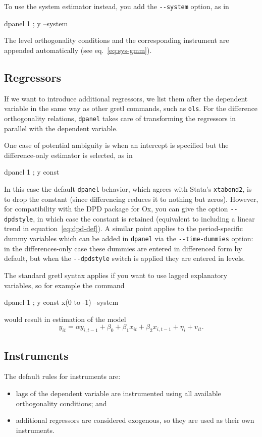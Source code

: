 To use the system estimator instead, you add the \verb|--system|
option, as in
\begin{code}
  dpanel 1 ; y --system
\end{code}
The level orthogonality conditions and the corresponding instrument
are appended automatically (see eq.\ \ref{eq:sys-gmm}).

\subsection{Regressors}

If we want to introduce additional regressors, we list them after the
dependent variable in the same way as other gretl commands, such as
\texttt{ols}.  For the difference orthogonality relations,
\texttt{dpanel} takes care of transforming the regressors in parallel
with the dependent variable.

One case of potential ambiguity is when an intercept is specified but
the difference-only estimator is selected, as in
\begin{code}
  dpanel 1 ; y const
\end{code}
In this case the default \texttt{dpanel} behavior, which agrees with
Stata's \texttt{xtabond2}, is to drop the constant (since differencing
reduces it to nothing but zeros). However, for compatibility with the
DPD package for Ox, you can give the option \verb|--dpdstyle|, in
which case the constant is retained (equivalent to including a linear
trend in equation~\ref{eq:dpd-def}).  A similar point applies to the
period-specific dummy variables which can be added in \texttt{dpanel}
via the \verb|--time-dummies| option: in the differences-only case
these dummies are entered in differenced form by default, but when the
\verb|--dpdstyle| switch is applied they are entered in levels.

The standard gretl syntax applies if you want to use lagged
explanatory variables, so for example the command
\begin{code}
  dpanel 1 ; y const x(0 to -1) --system
\end{code}
would result in estimation of the model
\[
  y_{it} = \alpha y_{i,t-1} + 
  \beta_0 + \beta_1 x_{it} + \beta_2 x_{i,t-1} +
  \eta_{i} + v_{it} .
\]


\subsection{Instruments}

The default rules for instruments are: 
\begin{itemize}
\item lags of the dependent variable are instrumented using all
  available orthogonality conditions; and
\item additional regressors are considered exogenous, so they are used
  as their own instruments.
\end{itemize}

